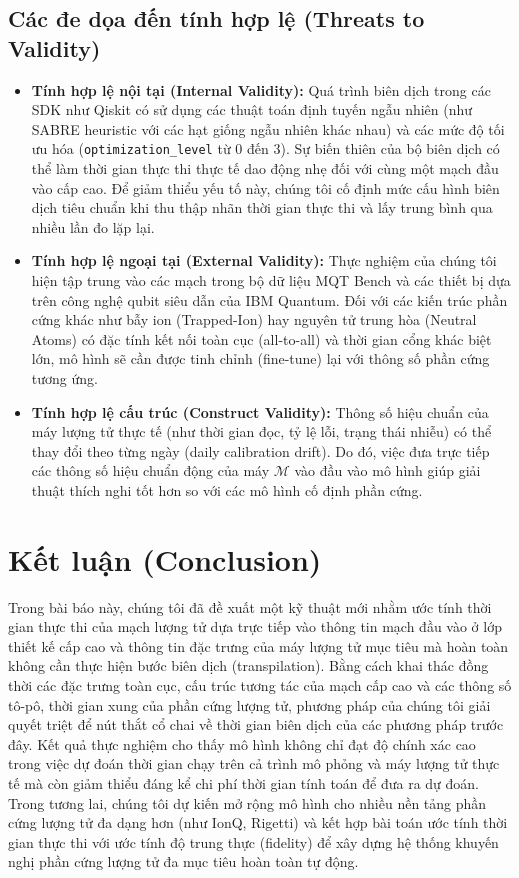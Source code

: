 \documentclass[11pt, a4paper]{article}
\begin{document}
\subsection{Các đe dọa đến tính hợp lệ (Threats to Validity)}
\begin{itemize}
    \item \textbf{Tính hợp lệ nội tại (Internal Validity):} Quá trình biên dịch trong các SDK như Qiskit có sử dụng các thuật toán định tuyến ngẫu nhiên (như SABRE heuristic với các hạt giống ngẫu nhiên khác nhau) và các mức độ tối ưu hóa (\texttt{optimization\_level} từ 0 đến 3). Sự biến thiên của bộ biên dịch có thể làm thời gian thực thi thực tế dao động nhẹ đối với cùng một mạch đầu vào cấp cao. Để giảm thiểu yếu tố này, chúng tôi cố định mức cấu hình biên dịch tiêu chuẩn khi thu thập nhãn thời gian thực thi và lấy trung bình qua nhiều lần đo lặp lại.
    \item \textbf{Tính hợp lệ ngoại tại (External Validity):} Thực nghiệm của chúng tôi hiện tập trung vào các mạch trong bộ dữ liệu MQT Bench và các thiết bị dựa trên công nghệ qubit siêu dẫn của IBM Quantum. Đối với các kiến trúc phần cứng khác như bẫy ion (Trapped-Ion) hay nguyên tử trung hòa (Neutral Atoms) có đặc tính kết nối toàn cục (all-to-all) và thời gian cổng khác biệt lớn, mô hình sẽ cần được tinh chỉnh (fine-tune) lại với thông số phần cứng tương ứng.
    \item \textbf{Tính hợp lệ cấu trúc (Construct Validity):} Thông số hiệu chuẩn của máy lượng tử thực tế (như thời gian đọc, tỷ lệ lỗi, trạng thái nhiễu) có thể thay đổi theo từng ngày (daily calibration drift). Do đó, việc đưa trực tiếp các thông số hiệu chuẩn động của máy $\mathcal{M}$ vào đầu vào mô hình giúp giải thuật thích nghi tốt hơn so với các mô hình cố định phần cứng.
\end{itemize}

\section{Kết luận (Conclusion)}
Trong bài báo này, chúng tôi đã đề xuất một kỹ thuật mới nhằm ước tính thời gian thực thi của mạch lượng tử dựa trực tiếp vào thông tin mạch đầu vào ở lớp thiết kế cấp cao và thông tin đặc trưng của máy lượng tử mục tiêu mà hoàn toàn không cần thực hiện bước biên dịch (transpilation). Bằng cách khai thác đồng thời các đặc trưng toàn cục, cấu trúc tương tác của mạch cấp cao và các thông số tô-pô, thời gian xung của phần cứng lượng tử, phương pháp của chúng tôi giải quyết triệt để nút thắt cổ chai về thời gian biên dịch của các phương pháp trước đây. Kết quả thực nghiệm cho thấy mô hình không chỉ đạt độ chính xác cao trong việc dự đoán thời gian chạy trên cả trình mô phỏng và máy lượng tử thực tế mà còn giảm thiểu đáng kể chi phí thời gian tính toán để đưa ra dự đoán. Trong tương lai, chúng tôi dự kiến mở rộng mô hình cho nhiều nền tảng phần cứng lượng tử đa dạng hơn (như IonQ, Rigetti) và kết hợp bài toán ước tính thời gian thực thi với ước tính độ trung thực (fidelity) để xây dựng hệ thống khuyến nghị phần cứng lượng tử đa mục tiêu hoàn toàn tự động.
\end{document}
